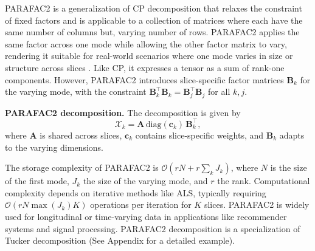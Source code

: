 
PARAFAC2 is a generalization of CP decomposition that relaxes the constraint of fixed factors and is applicable to a collection of matrices where each have the same number of columns but, varying number of rows. PARAFAC2 applies the same factor across one mode while allowing the other factor matrix to vary, rendering it suitable for real-world scenarios where one mode varies in size or structure across slices \cite{harshman1972parafac2}. Like CP, it expresses a tensor as a sum of rank-one components. However, PARAFAC2 introduces slice-specific factor matrices \( \mathbf{B}_k \) for the varying mode, with the constraint \( \mathbf{B}_k^\top \mathbf{B}_k = \mathbf{B}_j^\top \mathbf{B}_j \) for all \( k, j \). 
\begin{definition}\label{def:parafac2}
    \textbf{PARAFAC2 decomposition.}  The decomposition is given by
    $$
    \mathcal{X}_k = \mathbf{A} \, \text{diag}(\mathbf{c}_k) \, \mathbf{B}_k^\top,
    $$
    where $\mathbf{A}$ is shared across slices, $\mathbf{c}_k$ contains slice-specific weights, and $\mathbf{B}_k$ adapts to the varying dimensions.  
\end{definition}

 The storage complexity of PARAFAC2 is $\mathcal{O}(rN + r\sum_k J_k )$, where $N$ is the size of the first mode, $J_k$ the size of the varying mode, and $r$ the rank. Computational complexity depends on iterative methods like ALS, typically requiring $\mathcal{O}(rN \max(J_k) K)$ operations per iteration for $K$ slices. PARAFAC2 is widely used for longitudinal or time-varying data in applications like recommender systems and signal processing. PARAFAC2 decomposition is a specialization of Tucker decomposition (See Appendix for a detailed example). 


